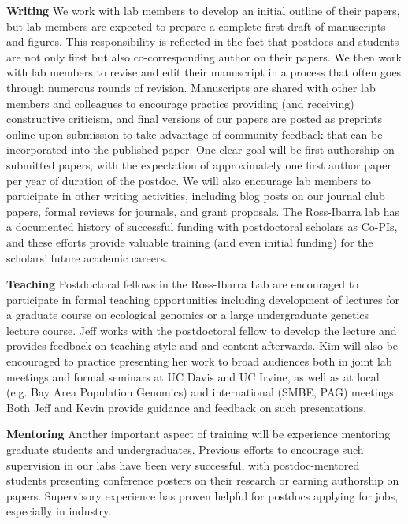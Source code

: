 \textbf{Writing} We work with lab members to develop an initial outline of their papers, but lab members are expected to prepare a complete first draft of manuscripts and figures. This responsibility is reflected in the fact that postdocs and students are not only first but also co-corresponding author on their papers. We then work with lab members to revise and edit their manuscript in a process that often goes through numerous rounds of revision. Manuscripts are shared with other lab members and colleagues to encourage practice providing (and receiving) constructive criticism, and final versions of our papers are posted as preprints online upon submission to take advantage of community feedback that can be incorporated into the published paper.  One clear goal will be first authorship on submitted papers, with the expectation of approximately one first author paper per year of duration of the postdoc.  We will also encourage lab members to participate in other writing activities, including blog posts on our journal club papers, formal reviews for journals, and grant proposals.  The Ross-Ibarra lab has a documented history of successful funding with postdoctoral scholars as Co-PIs, and these efforts provide valuable training (and even initial funding) for the scholars' future academic careers.  

\textbf{Teaching}  Postdoctoral fellows in the Ross-Ibarra Lab are encouraged to participate in formal teaching opportunities including development of lectures for a graduate course on ecological genomics or a large undergraduate genetics lecture course.  Jeff works with the postdoctoral fellow to develop the lecture and provides feedback on teaching style and and content afterwards. Kim will also be encouraged to practice presenting her work to broad audiences both in joint lab meetings and formal seminars at UC Davis and UC Irvine, as well as at local (e.g. Bay Area Population Genomics) and international (SMBE, PAG) meetings. Both Jeff and Kevin provide guidance and feedback on such presentations. 

\textbf{Mentoring}
Another important aspect of training will be experience mentoring graduate students and undergraduates.  Previous efforts to encourage such supervision in our labs have been very successful, with postdoc-mentored students presenting conference posters on their research or earning authorship on papers.  Supervisory experience has proven helpful for postdocs applying for jobs, especially in industry.

